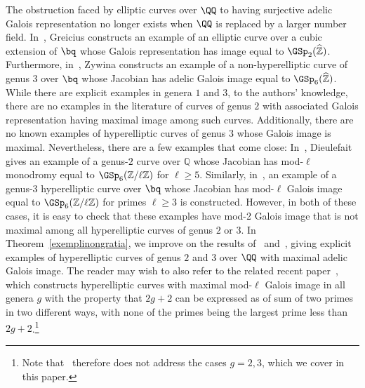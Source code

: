 \begin{comment}
In this paper, we give both asymptotic results
(Theorem~\ref{mainbldg}) and explicit examples
(Theorem~\ref{exemplinongratia}) 
for Galois representations of Jacobians of higher-genus hyperelliptic curves
with maximal adelic Galois image. In order to introduce our results,
we first recall many related results from the existing literature.
\end{comment}

The obstruction faced by elliptic curves over $\QQ$ to having surjective adelic Galois representation no longer exists when $\QQ$ is replaced by a larger number field. 
In~\cite{greasy}, Greicius constructs an example of an elliptic curve over a cubic extension of $\bq$ whose Galois representation
has image equal to $\GSp_2(\widehat{\mathbb Z})$.
Furthermore, in~\cite{seaweed}, Zywina constructs an example of a non-hyperelliptic curve of genus $3$ over $\bq$ whose Jacobian has adelic Galois image equal to $\GSp_6(\widehat{\mathbb Z})$. 
While there are explicit examples in genera $1$ and $3$, to the authors' knowledge,
there are no examples in the literature of curves of genus 
$2$ with associated Galois representation having maximal image among such curves.
Additionally, there are no known examples of hyperelliptic curves of genus $3$ whose Galois image is maximal.
Nevertheless, there are a few examples that come close:
	In~\cite[Theorem 5.4]{dooleyfat},
	Dieulefait gives an example of a
	genus-$2$ curve over $\mathbb Q$
	whose Jacobian has mod-$\ell$
	monodromy equal to $\GSp_6(\mathbb Z/\ell \mathbb Z)$
	for $\ell \ge 5$.
	Similarly, in~\cite[Corollary 1.1]{anni2016residual},
	an example of a genus-$3$ hyperelliptic curve
	over $\bq$ whose Jacobian has mod-$\ell$ Galois image equal to $\GSp_6(\mathbb Z/\ell \mathbb Z)$
	for primes $\ell \geq 3$ is constructed.
	However, in both of these cases, it is easy to check 
	that these examples have mod-2
	Galois image that is not maximal
	among all hyperelliptic curves of genus
	$2$ or $3$.
	In Theorem~\ref{exemplinongratia},
	we improve on the results of~\cite{dooleyfat} and~\cite{anni2016residual},
	giving explicit examples of hyperelliptic
	curves of genus $2$ and $3$ over $\QQ$ with maximal adelic Galois image.
	The reader may wish to also refer to the related recent paper~\cite{anni2017constructing}, which constructs
	hyperelliptic curves with maximal mod-$\ell$ Galois image in all genera $g$ with the property that $2g+2$ can be expressed as of sum of two primes in two different ways, with none of the primes being the largest prime less than $2g + 2$.\footnote{Note that~\cite{anni2017constructing}
	therefore does not address the cases $g = 2, 3$,
	which we cover in this paper.%
    }

